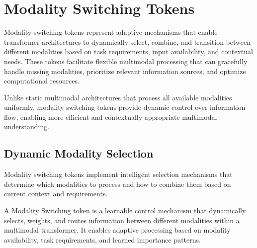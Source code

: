 
\section{Modality Switching Tokens}

Modality switching tokens represent adaptive mechanisms that enable transformer architectures to dynamically select, combine, and transition between different modalities based on task requirements, input availability, and contextual needs. These tokens facilitate flexible multimodal processing that can gracefully handle missing modalities, prioritize relevant information sources, and optimize computational resources.
\begin{comment}
Feedback: This is a good introduction. To make the concept more tangible, you could use an analogy: "If a standard multimodal model is like a panel of experts where each expert (vision, audio, text) always gets an equal say, a model with modality switching tokens is like a skilled project manager who can listen to all the experts but then dynamically decide which expert's opinion is most relevant for the current problem. Sometimes the visual expert is most important, sometimes it's the audio expert, and the switching token learns to make that decision on the fly."
\end{comment}

Unlike static multimodal architectures that process all available modalities uniformly, modality switching tokens provide dynamic control over information flow, enabling more efficient and contextually appropriate multimodal understanding.

\subsection{Dynamic Modality Selection}

Modality switching tokens implement intelligent selection mechanisms that determine which modalities to process and how to combine them based on current context and requirements.

\begin{definition}
A Modality Switching token is a learnable control mechanism that dynamically selects, weights, and routes information between different modalities within a multimodal transformer. It enables adaptive processing based on modality availability, task requirements, and learned importance patterns.
\end{definition}

